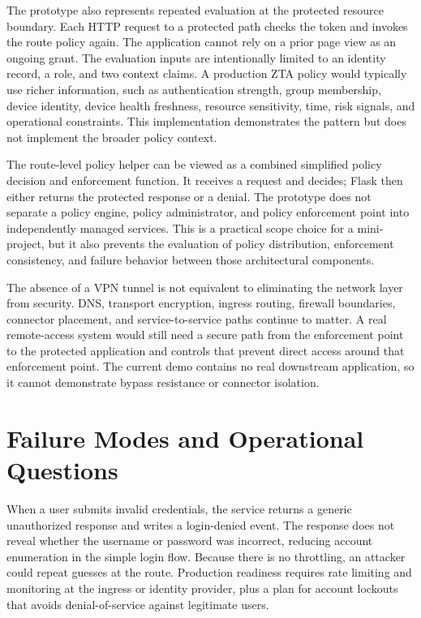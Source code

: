 The prototype also represents repeated evaluation at the protected resource boundary. Each HTTP request to a protected path checks the token and invokes the route policy again. The application cannot rely on a prior page view as an ongoing grant. The evaluation inputs are intentionally limited to an identity record, a role, and two context claims. A production ZTA policy would typically use richer information, such as authentication strength, group membership, device identity, device health freshness, resource sensitivity, time, risk signals, and operational constraints. This implementation demonstrates the pattern but does not implement the broader policy context.

The route-level policy helper can be viewed as a combined simplified policy decision and enforcement function. It receives a request and decides; Flask then either returns the protected response or a denial. The prototype does not separate a policy engine, policy administrator, and policy enforcement point into independently managed services. This is a practical scope choice for a mini-project, but it also prevents the evaluation of policy distribution, enforcement consistency, and failure behavior between those architectural components.

The absence of a VPN tunnel is not equivalent to eliminating the network layer from security. DNS, transport encryption, ingress routing, firewall boundaries, connector placement, and service-to-service paths continue to matter. A real remote-access system would still need a secure path from the enforcement point to the protected application and controls that prevent direct access around that enforcement point. The current demo contains no real downstream application, so it cannot demonstrate bypass resistance or connector isolation.

\section{Failure Modes and Operational Questions}
When a user submits invalid credentials, the service returns a generic unauthorized response and writes a login-denied event. The response does not reveal whether the username or password was incorrect, reducing account enumeration in the simple login flow. Because there is no throttling, an attacker could repeat guesses at the route. Production readiness requires rate limiting and monitoring at the ingress or identity provider, plus a plan for account lockouts that avoids denial-of-service against legitimate users.

